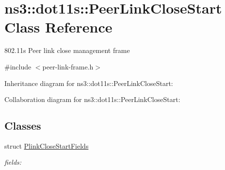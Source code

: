 \hypertarget{classns3_1_1dot11s_1_1PeerLinkCloseStart}{}\section{ns3\+:\+:dot11s\+:\+:Peer\+Link\+Close\+Start Class Reference}
\label{classns3_1_1dot11s_1_1PeerLinkCloseStart}


802.\+11s Peer link close management frame  




{\ttfamily \#include $<$peer-\/link-\/frame.\+h$>$}



Inheritance diagram for ns3\+:\+:dot11s\+:\+:Peer\+Link\+Close\+Start\+:


Collaboration diagram for ns3\+:\+:dot11s\+:\+:Peer\+Link\+Close\+Start\+:
\subsection*{Classes}
\begin{DoxyCompactItemize}
\item 
struct \hyperlink{structns3_1_1dot11s_1_1PeerLinkCloseStart_1_1PlinkCloseStartFields}{Plink\+Close\+Start\+Fields}
\begin{DoxyCompactList}\small\item\em fields\+: \end{DoxyCompactList}\end{DoxyCompactItemize}
